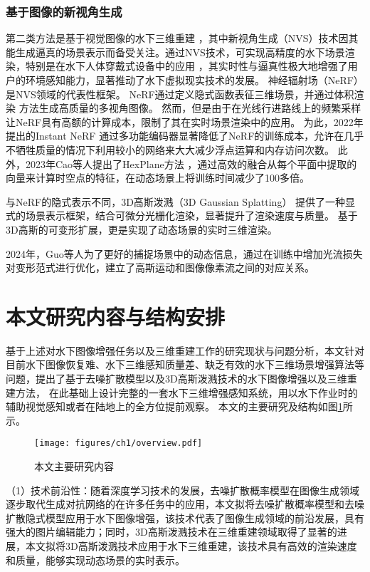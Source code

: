 \subsubsection{基于图像的新视角生成}
第二类方法是基于视觉图像的水下三维重建 \cite{vision_recon}，其中新视角生成（NVS）技术因其能生成逼真的场景表示而备受关注。通过NVS技术，可实现高精度的水下场景渲染，特别是在水下人体穿戴式设备中的应用 \cite{Xia2023}，其实时性与逼真性极大地增强了用户的环境感知能力，显著推动了水下虚拟现实技术的发展。
神经辐射场（NeRF） \cite{nerf}\cite{Mip_nerf360} 是NVS领域的代表性框架。
NeRF通过定义隐式函数表征三维场景，并通过体积渲染 \cite{volume_render} 方法生成高质量的多视角图像。
然而，但是由于在光线行进路线上的频繁采样让NeRF具有高额的计算成本，限制了其在实时场景渲染中的应用。
为此，2022年提出的Instant NeRF \cite{instant_nerf} 通过多功能编码器显著降低了NeRF的训练成本，允许在几乎不牺牲质量的情况下利用较小的网络来大大减少浮点运算和内存访问次数。
此外，2023年Cao等人提出了HexPlane方法 \cite{hex_plane}，通过高效的融合从每个平面中提取的向量来计算时空点的特征，在动态场景上将训练时间减少了100多倍。

与NeRF的隐式表示不同，3D高斯泼溅（3D Gaussian Splatting） \cite{3DGS} 提供了一种显式的场景表示框架，结合可微分光栅化渲染，显著提升了渲染速度与质量。
基于3D高斯的可变形扩展\cite{dynamic_3DGS1}\cite{dynamic_3DGS2}\cite{dynamic_3DGS_efficient}\cite{4DGS}，更是实现了动态场景的实时三维渲染。


2024年，Guo等人\cite{flow_2024motion}为了更好的捕捉场景中的动态信息，通过在训练中增加光流损失对变形范式进行优化，建立了高斯运动和图像像素流之间的对应关系。

\section{本文研究内容与结构安排}
基于上述对水下图像增强任务以及三维重建工作的研究现状与问题分析，本文针对目前水下图像恢复难、水下三维感知质量差、缺乏有效的水下三维场景增强算法等问题，提出了基于去噪扩散模型以及3D高斯泼溅技术的水下图像增强以及三维重建方法，
在此基础上设计完整的一套水下三维增强感知系统，用以水下作业时的辅助视觉感知或者在陆地上的全方位提前观察。
本文的主要研究及结构如图\ref{img:overview}所示。
\begin{figure}
    \centering
    \texttt{[image: figures/ch1/overview.pdf]}
    \caption{本文主要研究内容}
    \label{img:overview}
\end{figure}

（1）技术前沿性：随着深度学习技术的发展，去噪扩散概率模型在图像生成领域逐步取代生成对抗网络的在许多任务中的应用，本文拟将去噪扩散概率模型和去噪扩散隐式模型应用于水下图像增强，该技术代表了图像生成领域的前沿发展，具有强大的图片编辑能力；同时，3D高斯泼溅技术在三维重建领域取得了显著的进展，本文拟将3D高斯泼溅技术应用于水下三维重建，该技术具有高效的渲染速度和质量，能够实现动态场景的实时表示。

